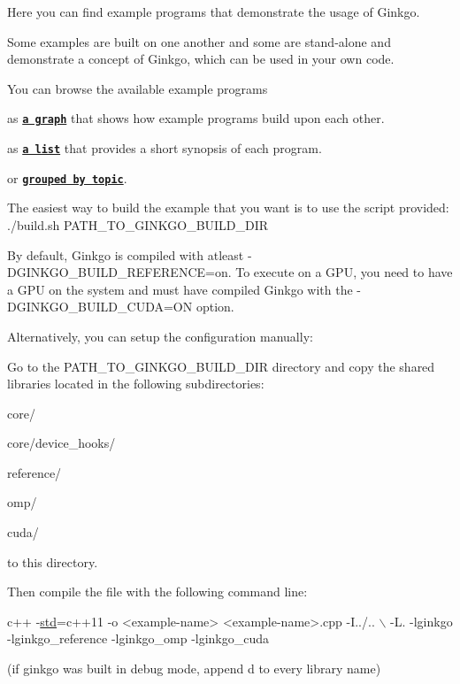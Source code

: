 Here you can find example programs that demonstrate the usage of Ginkgo.

Some examples are built on one another and some are stand-\/alone and demonstrate a concept of Ginkgo, which can be used in your own code.

You can browse the available example programs 
\begin{DoxyEnumerate}
\item as {\bfseries \href{#graph}{\tt a graph}} that shows how example programs build upon each other. 
\item as {\bfseries \href{#list}{\tt a list}} that provides a short synopsis of each program. 
\item or {\bfseries \href{#topic}{\tt grouped by topic}}. 
\end{DoxyEnumerate}

The easiest way to build the example that you want is to use the script provided\+: {\ttfamily ./build.sh P\+A\+T\+H\+\_\+\+T\+O\+\_\+\+G\+I\+N\+K\+G\+O\+\_\+\+B\+U\+I\+L\+D\+\_\+\+D\+IR }

By default, Ginkgo is compiled with atleast {\ttfamily -\/\+D\+G\+I\+N\+K\+G\+O\+\_\+\+B\+U\+I\+L\+D\+\_\+\+R\+E\+F\+E\+R\+E\+N\+CE=on}. To execute on a G\+PU, you need to have a G\+PU on the system and must have compiled Ginkgo with the {\ttfamily -\/\+D\+G\+I\+N\+K\+G\+O\+\_\+\+B\+U\+I\+L\+D\+\_\+\+C\+U\+DA=ON} option.

Alternatively, you can setup the configuration manually\+:

Go to the {\ttfamily  P\+A\+T\+H\+\_\+\+T\+O\+\_\+\+G\+I\+N\+K\+G\+O\+\_\+\+B\+U\+I\+L\+D\+\_\+\+D\+IR } directory and copy the shared libraries located in the following subdirectories\+: 
\begin{DoxyEnumerate}
\item {\ttfamily core/} 
\item {\ttfamily core/device\+\_\+hooks/} 
\item {\ttfamily reference/} 
\item {\ttfamily omp/} 
\item {\ttfamily cuda/} 
\end{DoxyEnumerate}to this directory.

Then compile the file with the following command line\+: 
\begin{DoxyCode}
c++ -\hyperlink{namespacestd}{std}=c++11 -o <example-name> <example-name>.cpp -I../.. \(\backslash\)
-L. -lginkgo -lginkgo\_reference -lginkgo\_omp -lginkgo\_cuda
\end{DoxyCode}
 (if ginkgo was built in debug mode, append \textquotesingle{}d\textquotesingle{} to every library name)

